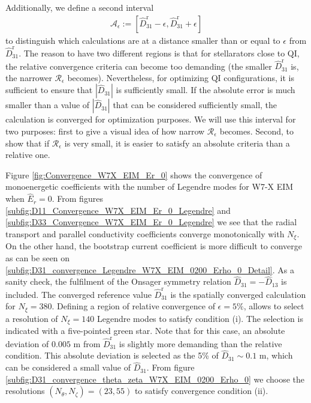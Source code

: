 Additionally, we define a second interval 
%
\begin{align}
	\mathcal{A}_{\epsilon}:=
	\left[
	\widehat{D}_{31}^{\text{r}}-\epsilon, \widehat{D}_{31}^{\text{r}}+\epsilon 
	\right]
\end{align}
to distinguish which calculations are at a distance smaller than or equal to $\epsilon$ from $\widehat{D}_{31}^{\text{r}}$. The reason to have two different regions is that for stellarators close to QI, the relative convergence criteria can become too demanding (the smaller $\widehat{D}_{31}^{\text{r}}$ is, the narrower $\mathcal{R}_{\epsilon}$ becomes). Nevertheless, for optimizing QI configurations, it is sufficient to ensure that $|\widehat{D}_{31}|$ is sufficiently small. If the absolute error is much smaller than a value of $|\widehat{D}_{31}|$ that can be considered sufficiently small, the calculation is converged for optimization purposes. We will use this interval for two purposes: first to give a visual idea of how narrow $\mathcal{R}_{\epsilon}$ becomes. Second, to show that if $\mathcal{R}_{\epsilon}$ is very small, it is easier to satisfy an absolute criteria than a relative one. 

Figure \ref{fig:Convergence_W7X_EIM_Er_0} shows the convergence of monoenergetic coefficients with the number of Legendre modes for W7-X EIM when $\hat{E}_r=0$. From figures \ref{subfig:D11_Convergence_W7X_EIM_Er_0_Legendre} and \ref{subfig:D33_Convergence_W7X_EIM_Er_0_Legendre} we see that the radial transport and parallel conductivity coefficients converge monotonically with $N_\xi$. On the other hand, the bootstrap current coefficient is more difficult to converge as can be seen on \ref{subfig:D31_convergence_Legendre_W7X_EIM_0200_Erho_0_Detail}. As a sanity check, the fulfilment of the Onsager symmetry relation $\widehat{D}_{31}= - \widehat{D}_{13}$ is included. The converged reference value $\widehat{D}_{31}^{\text{r}}$ is the spatially converged calculation for $N_\xi=380$. Defining a region of relative convergence of $\epsilon=5\%$, allows to select a resolution of $N_\xi=140$ Legendre modes to satisfy condition (i). The selection is indicated with a five-pointed green star. Note that for this case, an absolute deviation of $0.005$ m from $\widehat{D}_{31}^{\text{r}}$ is slightly more demanding than the relative condition. This absolute deviation is selected as the 5\% of $\widehat{D}_{31}\sim 0.1$ m, which can be considered a small value of $\widehat{D}_{31}$. From figure \ref{subfig:D31_convergence_theta_zeta_W7X_EIM_0200_Erho_0} we choose the resolutions $(N_\theta,N_\zeta)=(23,55)$ to satisfy convergence condition (ii). 


